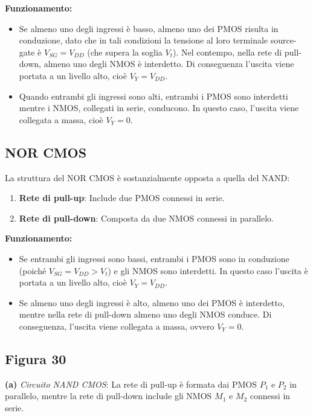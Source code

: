 \bigskip
\textbf{Funzionamento:}
\begin{itemize}
  \item Se almeno uno degli ingressi è basso, almeno uno dei PMOS risulta in conduzione, dato che in tali condizioni la tensione al loro terminale source-gate è \(V_{SG}=V_{DD}\) (che supera la soglia \(V_t\)). Nel contempo, nella rete di pull-down, almeno uno degli NMOS è interdetto. Di conseguenza l'uscita viene portata a un livello alto, cioè \(V_Y = V_{DD}\).
  \item Quando entrambi gli ingressi sono alti, entrambi i PMOS sono interdetti mentre i NMOS, collegati in serie, conducono. In questo caso, l'uscita viene collegata a massa, cioè \(V_Y = 0\).
\end{itemize}

\subsection{NOR CMOS}

La struttura del NOR CMOS è sostanzialmente opposta a quella del NAND:
\begin{enumerate}
  \item \textbf{Rete di pull-up}: Include due PMOS connessi in serie.
  \item \textbf{Rete di pull-down}: Composta da due NMOS connessi in parallelo.
\end{enumerate}

\bigskip
\textbf{Funzionamento:}
\begin{itemize}
  \item Se entrambi gli ingressi sono bassi, entrambi i PMOS sono in conduzione (poiché \(V_{SG}=V_{DD}>V_t\)) e gli NMOS sono interdetti. In questo caso l'uscita è portata a un livello alto, cioè \(V_Y = V_{DD}\).
  \item Se almeno uno degli ingressi è alto, almeno uno dei PMOS è interdetto, mentre nella rete di pull-down almeno uno degli NMOS conduce. Di conseguenza, l'uscita viene collegata a massa, ovvero \(V_Y = 0\).
\end{itemize}

\subsection*{Figura 30}

\textbf{(a)} \textit{Circuito NAND CMOS}: La rete di pull-up è formata dai PMOS \(P_1\) e \(P_2\) in parallelo, mentre la rete di pull-down include gli NMOS \(M_1\) e \(M_2\) connessi in serie.

